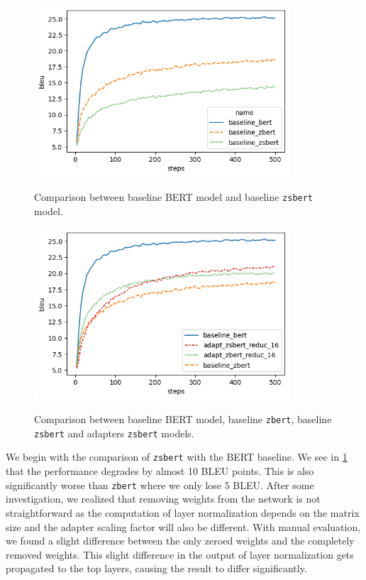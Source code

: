 \begin{figure}[h]
    {\includegraphics[width=0.85\textwidth]{img/baseline_zsbert.png}}
    \centering
    \caption{Comparison between baseline BERT model and baseline \texttt{zsbert} model.}
    \label{img:baseline_zsbert}
\end{figure}

\begin{figure}[]
    {\includegraphics[width=0.85\textwidth]{img/adapter_zsbert.png}}
    \centering
    \caption{Comparison between baseline BERT model, baseline \texttt{zbert}, baseline \texttt{zsbert} and adapters \texttt{zsbert} models.}
    \label{img:adapter_zsbert}
\end{figure}


We begin with the comparison of \texttt{zsbert} with the BERT baseline. We see in \cref{img:baseline_zsbert} that the performance degrades by almost 10 BLEU points. This is also significantly worse than \texttt{zbert} where we only lose 5 BLEU. After some investigation, we realized that removing weights from the network is not straightforward as the computation of layer normalization depends on the matrix size and the adapter scaling factor will also be different. With manual evaluation, we found a slight difference between the only zeroed weights and the completely removed weights. This slight difference in the output of layer normalization gets propagated to the top layers, causing the result to differ significantly.

